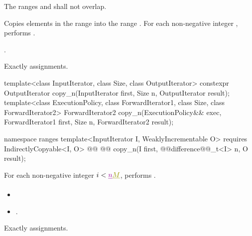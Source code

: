 \begin{itemdescr}
\pnum
\requires The ranges  and
 shall not overlap.

\pnum
\effects Copies elements in the range  into
the range .
For each non-negative integer ,
performs .

\pnum
\returns {}.

\pnum
\complexity Exactly  assignments.
\end{itemdescr}

%
\begin{itemdecl}
template<class InputIterator, class Size, class OutputIterator>
  constexpr OutputIterator copy_n(InputIterator first, Size n,
                                  OutputIterator result);
template<class ExecutionPolicy, class ForwardIterator1, class Size, class ForwardIterator2>
  ForwardIterator2 copy_n(ExecutionPolicy&& exec,
                          ForwardIterator1 first, Size n,
                          ForwardIterator2 result);
\end{itemdecl}\begin{addedblock}\begin{itemdecl}
namespace ranges {
  template<InputIterator I, WeaklyIncrementable O>
    requires IndirectlyCopyable<I, O>
    @@
    @@
      copy_n(I first, @@difference@@_t<I> n, O result);
}
\end{itemdecl}\end{addedblock}


\begin{itemdescr}
\pnum
{}

\pnum
\effects For each non-negative integer
$i < \oldtxt{n}\newtxt{M}$, performs .

\pnum
\returns
\begin{itemize}
\item {}
\item {}
  .
\end{itemize}

\pnum
\complexity Exactly  assignments.
\end{itemdescr}

